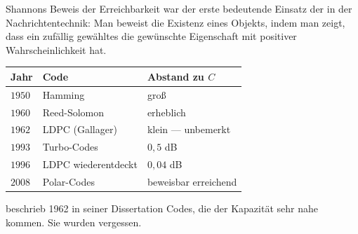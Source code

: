\begin{geschichte}
Shannons Beweis der Erreichbarkeit war der erste bedeutende Einsatz der  in der Nachrichtentechnik: Man beweist die Existenz eines Objekts, indem man zeigt, dass ein zufällig gewähltes die gewünschte Eigenschaft mit positiver Wahrscheinlichkeit hat.

\begin{center}
\begin{minipage}{0.9\textwidth}
\end{minipage}
\end{center}

\begin{center}
{\small
\renewcommand{\arraystretch}{1.42}
\begin{tabular}{@{}P{1.4cm}P{2.6cm}P{3.8cm}@{}}
\toprule
\textbf{Jahr} & \textbf{Code} & \textbf{Abstand zu $C$}\\
\midrule
$1950$ & Hamming & groß\\
$1960$ & Reed-Solomon & erheblich\\
$1962$ & LDPC (Gallager) & \textcolor{gruen}{klein --- unbemerkt}\\
$1993$ & Turbo-Codes & $0{,}5$ dB\\
$1996$ & LDPC wiederentdeckt & $0{,}04$ dB\\
$2008$ & Polar-Codes & \textcolor{gruen}{beweisbar erreichend}\\
\bottomrule
\end{tabular}}
\end{center}

 beschrieb 1962 in seiner Dissertation Codes, die der Kapazität sehr nahe kommen. Sie wurden vergessen.

\begin{center}
\begin{minipage}{0.9\textwidth}
\end{minipage}
\end{center}


\end{geschichte}

